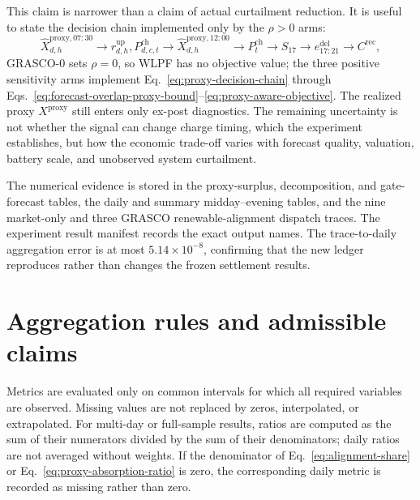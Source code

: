 \documentclass[11pt,a4paper]{article}
\begin{document}
This claim is narrower than a claim of actual curtailment reduction.  It is
useful to state the decision chain implemented only by the $\rho>0$ arms:
\begin{equation}
  \widehat X^{\mathrm{proxy},07{:}30}_{d,h}
  \longrightarrow r^{\mathrm{up}}_{d,h},P^{\mathrm{ch}}_{d,c,t}
  \longrightarrow \widehat X^{\mathrm{proxy},12{:}00}_{d,h}
  \longrightarrow P^{\mathrm{ch}}_t
  \longrightarrow S_{17}
  \longrightarrow e^{\mathrm{del}}_{17{:}21}
  \longrightarrow C^{\mathrm{rec}},
  \label{eq:proxy-decision-chain}
\end{equation}
GRASCO-$0$ sets $\rho=0$, so WLPF has no objective value; the three positive
sensitivity arms implement Eq.~\eqref{eq:proxy-decision-chain} through
Eqs.~\eqref{eq:forecast-overlap-proxy-bound}--\eqref{eq:proxy-aware-objective}.
The realized proxy $X^{\mathrm{proxy}}$ still enters only ex-post diagnostics.
The remaining uncertainty is not whether the signal can change charge timing,
which the experiment establishes, but how the economic trade-off varies with
forecast quality, valuation, battery scale, and unobserved system curtailment.

The numerical evidence is stored in the proxy-surplus, decomposition, and
gate-forecast tables, the daily and summary midday--evening tables, and the nine
market-only and three GRASCO renewable-alignment dispatch traces.
The experiment result manifest records the exact output names.  The
trace-to-daily aggregation error is at most $5.14\times10^{-8}$, confirming
that the new ledger reproduces rather than changes the frozen settlement
results.

\section{Aggregation rules and admissible claims}

Metrics are evaluated only on common intervals for which all required variables are observed. Missing values are not replaced by zeros, interpolated, or extrapolated. For multi-day or full-sample results, ratios are computed as the sum of their numerators divided by the sum of their denominators; daily ratios are not averaged without weights. If the denominator of Eq.~\eqref{eq:alignment-share} or Eq.~\eqref{eq:proxy-absorption-ratio} is zero, the corresponding daily metric is recorded as missing rather than zero.
\end{document}
